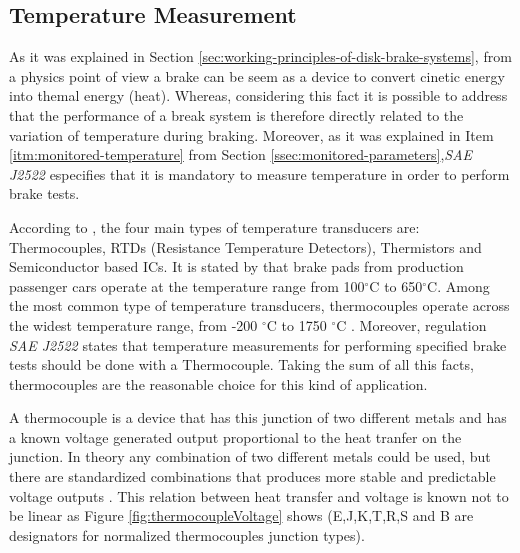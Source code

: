 \subsection{Temperature Measurement} \label{ssec:temperatureMeasurement}
	As it was explained in Section \ref{sec:working-principles-of-disk-brake-systems}, from a physics point of view a brake can be seem as a device to convert cinetic energy into themal energy (heat). Whereas, considering this fact it is possible to address that the performance of a break system is therefore directly related to the variation of temperature during braking. Moreover, as it was explained in Item \ref{itm:monitored-temperature} from Section \ref{ssec:monitored-parameters},\textit{SAE J2522} \cite{saej2522} especifies that it is mandatory to measure temperature in order to perform brake tests.
	\par
	According to \cite{gums2018}, the four main types of temperature transducers are: Thermocouples, RTDs (Resistance Temperature Detectors), Thermistors and Semiconductor based ICs. It is stated by \cite{newton2016braketemperatures} that brake pads from production passenger cars operate at the temperature range from 100$^{\circ}$C to 650$^{\circ}$C. Among the most common type of temperature transducers, thermocouples operate across the widest temperature range, from -200 $^{\circ}$C to 1750 $^{\circ}$C \cite{ametherm2018}. Moreover, regulation \textit{SAE J2522} \cite{saej2522} states that temperature measurements for performing specified brake tests should be done with a Thermocouple. Taking the sum of all this facts, thermocouples are the reasonable choice for this kind of application.
	\par
	A thermocouple is a device that has this junction of two different metals and has a known voltage generated output proportional to the heat tranfer on the junction. In theory any combination of two different metals could be used, but there are standardized combinations that produces more stable and predictable voltage outputs \cite{pollock1991thermocouples}. This relation between heat transfer and voltage is known not to be linear as Figure \ref{fig:thermocoupleVoltage} shows (E,J,K,T,R,S and B are designators for normalized thermocouples junction types).


